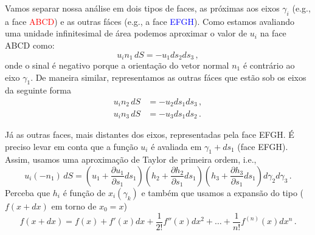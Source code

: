 Vamos separar nossa an\'alise em dois tipos de faces, as pr\'oximas aos eixos
$\gamma_{i}$ (e.g., a face \textcolor{red}{ABCD}) e as outras f\'aces (e.g., a
face \textcolor{blue}{EFGH}).
Como estamos avaliando uma unidade infinitesimal de \'area podemos aproximar o valor de
$u_i$ na face ABCD como:
\begin{equation}
u_in_1\,dS=-u_{1}ds_{2}ds_{3}\, ,
\end{equation}
onde o sinal \'e negativo porque a orienta\c{c}\~ao do vetor normal $n_1$ \'e
contr\'ario ao eixo $\gamma_1$. De maneira similar, representamos as outras
f\'aces que est\~ao sob os eixos da seguinte forma
\begin{align}
  u_in_2\,dS&=-u_{2}ds_{1}ds_{3}\, , \\
  u_in_3\,dS&=-u_{3}ds_{1}ds_{2}\, .
\end{align}

J\'a as outras faces, mais distantes dos eixos, representadas pela face EFGH.
\'E preciso levar em conta que a fun\c{c}\~ao $u_i$ \'e avaliada em
$\gamma_1+ds_1$  (face EFGH). Assim, usamos uma aproxima\c{c}\~ao
de Taylor de primeira ordem, i.e.,
\begin{equation}
  u_i(-n_1)\,dS = \left(u_1 + \frac{\partial u_1}{\partial s_1}ds_1\right)
  \left(h_2 + \frac{\partial h_2}{\partial s_1}ds_1\right)
  \left(h_3 + \frac{\partial h_3}{\partial
  s_1}ds_1\right)d\gamma_2d\gamma_3\, .
  \label{eq:taylorface}
\end{equation}
Perceba que $h_i$ \'e fun\c{c}\~ao de $x_i(\gamma_k)$ e tamb\'em que usamos a expans\~ao do tipo
($f(x+dx)$ em torno de $x_0 = x$)
\begin{equation}
  f(x+dx) = f(x) + f'(x)dx + \frac{1}{2!}f''(x)dx^2 + \dots
  +\frac{1}{n!}f^{(n)}(x)dx^n \, .
\end{equation}

